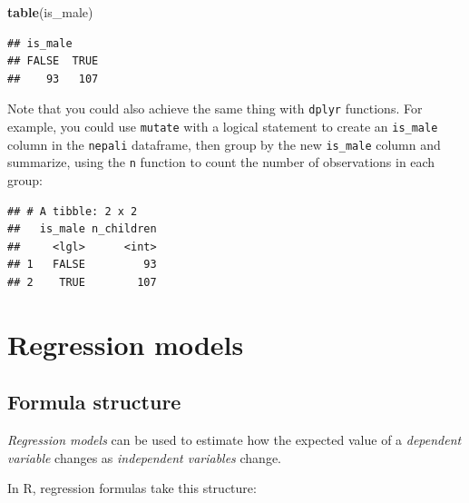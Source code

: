 \documentclass[]{book}
\makeatletter
\newenvironment{Shaded}{\begin{snugshade}}{\end{snugshade}}
\newcommand{\KeywordTok}[1]{\textcolor[rgb]{0.13,0.29,0.53}{\textbf{#1}}}
\newcommand{\DataTypeTok}[1]{\textcolor[rgb]{0.13,0.29,0.53}{#1}}
\newcommand{\StringTok}[1]{\textcolor[rgb]{0.31,0.60,0.02}{#1}}
\newcommand{\OperatorTok}[1]{\textcolor[rgb]{0.81,0.36,0.00}{\textbf{#1}}}
\newcommand{\NormalTok}[1]{#1}
\newenvironment{kframe}{%
\medskip{}
\setlength{\fboxsep}{.8em}
 \def\at@end@of@kframe{}%
 \ifinner\ifhmode%
  \def\at@end@of@kframe{\end{minipage}}%
  \begin{minipage}{\columnwidth}%
 \fi\fi%
 \def\FrameCommand##1{\hskip\@totalleftmargin \hskip-\fboxsep
 \colorbox{shadecolor}{##1}\hskip-\fboxsep
     \hskip-\linewidth \hskip-\@totalleftmargin \hskip\columnwidth}%
 \MakeFramed {\advance\hsize-\width
   \@totalleftmargin\z@ \linewidth\hsize
   \@setminipage}}%
 {\par\unskip\endMakeFramed%
 \at@end@of@kframe}
\renewenvironment{Shaded}{\begin{kframe}}{\end{kframe}}
\theoremstyle{definition}
\theoremstyle{definition}
\theoremstyle{definition}
\theoremstyle{remark}
\makeatother
\begin{document}
\begin{Shaded}
\begin{Highlighting}[]
\KeywordTok{table}\NormalTok{(is_male)}
\end{Highlighting}
\end{Shaded}

\begin{verbatim}
## is_male
## FALSE  TRUE 
##    93   107
\end{verbatim}

Note that you could also achieve the same thing with \texttt{dplyr}
functions. For example, you could use \texttt{mutate} with a logical
statement to create an \texttt{is\_male} column in the \texttt{nepali}
dataframe, then group by the new \texttt{is\_male} column and summarize,
using the \texttt{n} function to count the number of observations in
each group:

\begin{Shaded}
\end{Shaded}

\begin{verbatim}
## # A tibble: 2 x 2
##   is_male n_children
##     <lgl>      <int>
## 1   FALSE         93
## 2    TRUE        107
\end{verbatim}

\section{Regression models}\label{regression-models}

\subsection{Formula structure}\label{formula-structure}

\emph{Regression models} can be used to estimate how the expected value
of a \emph{dependent variable} changes as \emph{independent variables}
change. \medskip

In R, regression formulas take this structure:
\end{document}
